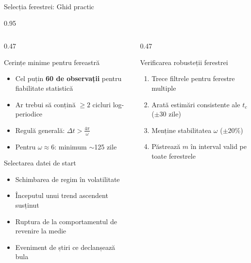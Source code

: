 \documentclass[9pt, aspectratio=169, t]{beamer}
\begin{document}
\begin{frame}{Selecția ferestrei: Ghid practic}
    \begin{cminipage}{0.95\textwidth}
    {\footnotesize
    \begin{columns}[T]
        \begin{column}{0.47\textwidth}
            \begin{block}{Cerințe minime pentru fereastră}
                \begin{itemize}\setlength{\itemsep}{0pt}
                    \item Cel puțin \textbf{60 de observații} pentru fiabilitate statistică
                    \item Ar trebui să conțină $\geq 2$ cicluri log-periodice
                    \item Regulă generală: $\Delta t > \frac{4\pi}{\omega}$
                    \item Pentru $\omega \approx 6$: minimum $\sim$125 zile
                \end{itemize}
            \end{block}

            \begin{exampleblock}{Selectarea datei de start}
                \begin{itemize}\setlength{\itemsep}{0pt}
                    \item Schimbarea de regim în volatilitate
                    \item Începutul unui trend ascendent susținut
                    \item Ruptura de la comportamentul de revenire la medie
                    \item Eveniment de știri ce declanșează bula
                \end{itemize}
            \end{exampleblock}
        \end{column}
        \begin{column}{0.47\textwidth}
            \begin{alertblock}{Verificarea robusteții ferestrei}
                \begin{enumerate}\setlength{\itemsep}{0pt}
                    \item Trece filtrele pentru ferestre multiple
                    \item Arată estimări consistente ale $t_c$ ($\pm 30$ zile)
                    \item Menține stabilitatea $\omega$ ($\pm 20\%$)
                    \item Păstrează $m$ în interval valid pe toate ferestrele
                \end{enumerate}
            \end{alertblock}


\end{column}
\end{columns}}
\end{cminipage}
\end{frame}
\end{document}
